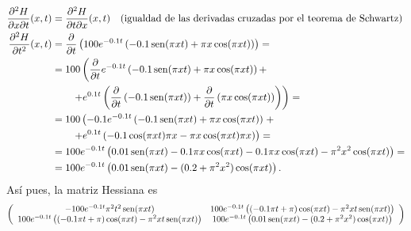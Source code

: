 {\begin{enumerate}
\begin{align*}
\frac{\partial^2 H}{\partial x\partial t}(x,t) &= \frac{\partial^2 H}{\partial t\partial x}(x,t) \quad (\mbox{igualdad de las derivadas cruzadas por el teorema de Schwartz})\\
\frac{\partial^2 H}{\partial t^2}(x,t) &= \frac{\partial}{\partial t} \left(100 e^{-0.1t}\left(-0.1 \operatorname{sen}(\pi xt) + \pi x \cos(\pi xt)\right)\right)  =\\
&= 100\left(\frac{\partial}{\partial t} e^{-0.1t}\left(-0.1 \operatorname{sen}(\pi xt) + \pi x \cos(\pi xt)\right) +\right.\\
&\left. \qquad + e^{0.1t}\left(\frac{\partial}{\partial t}\left(-0.1\operatorname{sen}(\pi xt)\right) + \frac{\partial}{\partial t}\left(\pi x \cos(\pi xt)\right)\right)\right) =\\
&= 100\left(-0.1 e^{-0.1t}\left(-0.1 \operatorname{sen}(\pi xt) + \pi x \cos(\pi xt)\right)\right. +\\
&\left. \qquad + e^{0.1t}\left(-0.1\cos(\pi xt)\pi x - \pi x \cos(\pi xt)\pi x\right)\right) =\\
&= 100e^{-0.1t}\left(0.01\operatorname{sen}(\pi xt) -0.1 \pi x \cos(\pi xt) -0.1\pi x\cos(\pi xt) - \pi^2 x^2 \cos(\pi xt)\right) = \\
&= 100e^{-0.1t}\left(0.01\operatorname{sen}(\pi xt) -(0.2+\pi^2x^2) \cos(\pi xt)\right).
\end{align*}
Así pues, la matriz Hessiana es
\[
\left(
\begin{array}{cc}
-100e^{-0.1t}\pi^2 t^2\operatorname{sen}(\pi xt) & 100e^{-0.1t}\left((-0.1\pi t+\pi)\cos(\pi xt) - \pi^2 xt \operatorname{sen}(\pi xt)\right) \\
100e^{-0.1t}\left((-0.1\pi t+\pi)\cos(\pi xt) - \pi^2 xt \operatorname{sen}(\pi xt)\right) & 100e^{-0.1t}\left(0.01\operatorname{sen}(\pi xt) -(0.2+\pi^2x^2) \cos(\pi xt)\right)
\end{array}
\right)
\]
\end{enumerate}
}


